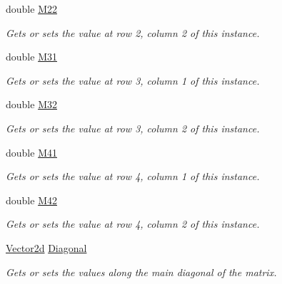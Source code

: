 \begin{DoxyCompactItemize}
double \hyperlink{struct_open_t_k_1_1_matrix4x2d_aa8605507229324d9986d025e09c14d8f}{M22}
\begin{DoxyCompactList}\small\item\em Gets or sets the value at row 2, column 2 of this instance. \end{DoxyCompactList}\item 
double \hyperlink{struct_open_t_k_1_1_matrix4x2d_af2e40cf33c323765e5c05308fe88c819}{M31}
\begin{DoxyCompactList}\small\item\em Gets or sets the value at row 3, column 1 of this instance. \end{DoxyCompactList}\item 
double \hyperlink{struct_open_t_k_1_1_matrix4x2d_a61b5126bb2623dc736e9edc588357c4e}{M32}
\begin{DoxyCompactList}\small\item\em Gets or sets the value at row 3, column 2 of this instance. \end{DoxyCompactList}\item 
double \hyperlink{struct_open_t_k_1_1_matrix4x2d_a6a3d7245b475d3543c7de03740cf9e3d}{M41}
\begin{DoxyCompactList}\small\item\em Gets or sets the value at row 4, column 1 of this instance. \end{DoxyCompactList}\item 
double \hyperlink{struct_open_t_k_1_1_matrix4x2d_ad35fb56e56ecaecf7444a70a6017eec9}{M42}
\begin{DoxyCompactList}\small\item\em Gets or sets the value at row 4, column 2 of this instance. \end{DoxyCompactList}\item 
\hyperlink{struct_open_t_k_1_1_vector2d}{Vector2d} \hyperlink{struct_open_t_k_1_1_matrix4x2d_a821c3d4f35d62cb5362c097d8dbefdbe}{Diagonal}
\begin{DoxyCompactList}\small\item\em Gets or sets the values along the main diagonal of the matrix. \end{DoxyCompactList}\item 

\end{DoxyCompactItemize}
